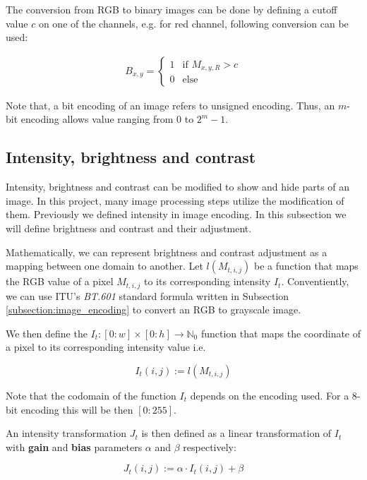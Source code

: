 \documentclass[pdftex,12pt,a4paper]{report}
\begin{document}
The conversion from RGB to binary images can be done by defining a cutoff value $c$ on one of the channels, e.g. for red channel, following conversion can be used:

\begin{gather*}
B_{x, y} =
\begin{cases}
  1 & \text{if } M_{x, y, R} > c\\    
  0 & \text{else}  
\end{cases}
\end{gather*}

Note that, a bit encoding of an image refers to unsigned encoding. Thus, an $m$-bit encoding allows value ranging from $0$ to $2^m - 1$.

\subsection{Intensity, brightness and contrast}
\label{subsection:brightness_contrast_adjustment}

Intensity, brightness and contrast can be modified to show and hide parts of an image. In this project, many image processing steps utilize the modification of them. Previously we defined  intensity in image encoding. In this subsection we will define brightness and contrast and their adjustment.

Mathematically, we can represent brightness and contrast adjustment as a mapping between one domain to another. Let $l(M_{t, i, j})$ be a function that maps the RGB value of a pixel $M_{t, i, j}$ to its corresponding intensity $I_t$. Conventiently, we can use ITU's \textit{BT.601} standard formula written in Subsection \ref{subsection:image_encoding} to convert an RGB to grayscale image.

We then define the $I_t: [0:w] \times [0:h] \rightarrow \mathbb{N}_0$ function that maps the coordinate of a pixel to its corresponding intensity value i.e.

$$
I_t(i, j) := l(M_{t, i, j})
$$

Note that the codomain of the function $I_t$ depends on the encoding used. For a 8-bit encoding this will be then $[0:255]$.

An intensity transformation $J_t$ is then defined as a linear transformation of $I_t$ with \textbf{gain} and \textbf{bias} parameters $\alpha$ and $\beta$ respectively:

\begin{equation}
\label{equation:br_ct_transform}
J_t(i, j) := \alpha \cdot I_t(i, j) + \beta
\end{equation}
\end{document}
